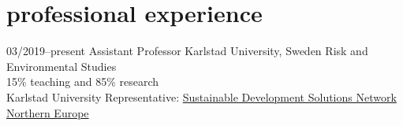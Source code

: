 \documentclass[]{friggeri-cv} %
\begin{document}
\section{professional experience}

\begin{entrylist}
\entry
{\small{03/2019--present}}
{Assistant Professor}
{Karlstad University, Sweden}
{Risk and Environmental Studies\\
15\% teaching and 85\% research\\
Karlstad University Representative: \href{https://www.unsdsn-ne.org/en}{Sustainable Development Solutions Network Northern Europe}}
\end{entrylist}
\end{document}

